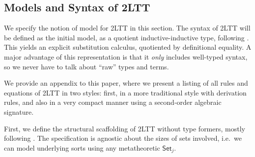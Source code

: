 \documentclass[acmsmall,review]{acmart}
\newcommand{\Set}{\mathsf{Set}}
\theoremstyle{remark}
\begin{document}
\subsection{Models and Syntax of 2LTT}\label{sec:2lttmod}

We specify the notion of model for 2LTT in this section. The syntax of 2LTT will
be defined as the initial model, as a quotient inductive-inductive type,
following \cite{ttintt}. This yields an explicit substitution calculus,
quotiented by definitional equality. A major advantage of this representation is
that it \emph{only} includes well-typed syntax, so we never have to talk about
``raw'' types and terms.

We provide an appendix to this paper, where we present a listing of all rules
and equations of 2LTT in two styles: first, in a more traditional style with
derivation rules, and also in a very compact manner using a second-order
algebraic signature.

First, we define the structural scaffolding of 2LTT without type formers, mostly
following \cite{twolevel}. The specification is agnostic about the sizes of sets
involved, i.e.\ we can model underlying sorts using any metatheoretic $\Set_j$.
\end{document}
